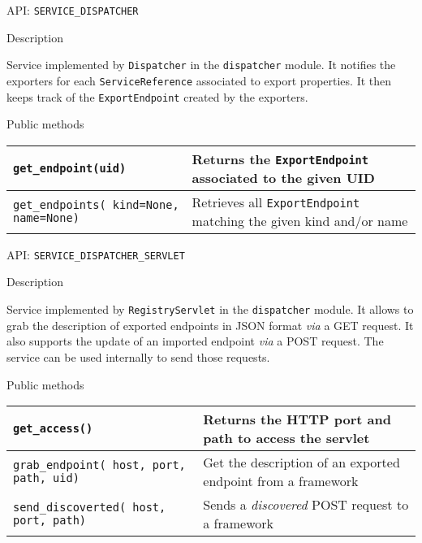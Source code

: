 
\begin{frame}{API: \texttt{SERVICE\_DISPATCHER}}
\begin{block}{Description}
\begin{small}
Service implemented by \texttt{Dispatcher} in the \texttt{dispatcher} module.
It notifies the exporters for each \texttt{ServiceReference} associated to export properties.
It then keeps track of the \texttt{ExportEndpoint} created by the exporters.
\end{small}
\end{block}

\begin{block}{Public methods}
\begin{small}
\begin{tabular}{p{13em} p{}}
\texttt{get\_endpoint(uid)} & Returns the \texttt{ExportEndpoint} associated to the given UID \\
\hline
\texttt{get\_endpoints( kind=None, name=None)} & Retrieves all \texttt{ExportEndpoint} matching the given kind and/or name \\
\end{tabular}
\end{small}
\end{block}
\end{frame}

\begin{frame}{API: \texttt{SERVICE\_DISPATCHER\_SERVLET}}
\begin{block}{Description}
\begin{small}
Service implemented by \texttt{RegistryServlet} in the \texttt{dispatcher} module.
It allows to grab the description of exported endpoints in JSON format \textit{via} a GET request.
It also supports the update of an imported endpoint \textit{via} a POST request.
The service can be used internally to send those requests.
\end{small}
\end{block}

\begin{block}{Public methods}
\begin{small}
\begin{tabular}{p{} p{}}
\texttt{get\_access()} & Returns the HTTP port and path to access the servlet \\
\hline
\texttt{grab\_endpoint( host, port, path, uid)} & Get the description of an exported endpoint from a framework\\
\hline
\texttt{send\_discoverted( host, port, path)} & Sends a \textit{discovered} POST request to a framework \\
\end{tabular}
\end{small}
\end{block}
\end{frame}

